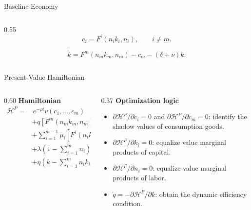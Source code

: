 \begin{frame}{Baseline Economy}
\begin{columns}[T,onlytextwidth]
\begin{column}{0.55\textwidth}
      \vspace{-0.02cm}
      \begin{equation*}
        c_i=F^i(n_i k_i,n_i),\qquad i\neq m .
      \end{equation*}

      \vspace{-0.02cm}
      \begin{equation*}
        \dot{k}=F^m(n_mk_m,n_m)-c_m-(\delta+\nu)k .
      \end{equation*}
    \end{column}
  \end{columns}
\end{frame}

\begin{frame}{Present-Value Hamiltonian}
  \scriptsize
  \setlength{\abovedisplayskip}{2pt}
  \setlength{\belowdisplayskip}{2pt}
  \setlength{\jot}{4pt}
  \begin{columns}[T,onlytextwidth]
    \begin{column}{0.60\textwidth}
      {\bfseries Hamiltonian}
      \vspace{-0.08cm}
      \begin{equation*}
        \begin{aligned}
          \mathcal H^P
          =&\, e^{-\rho t}v(c_1,\ldots,c_m)\\
          &+q\!\left[
            F^m(n_mk_m,n_m)-c_m-(\delta+\nu)k
          \right]\\
          &+\sum_{i=1}^{m-1}\mu_i\!\left[
            F^i(n_ik_i,n_i)-c_i
          \right]\\
          &+\lambda\!\left(1-\sum_{i=1}^m n_i\right)\\
          &+\eta\!\left(k-\sum_{i=1}^m n_i k_i\right).
        \end{aligned}
      \end{equation*}
    \end{column}
    \begin{column}{0.37\textwidth}
      \textbf{Optimization logic}
      \vspace{0.04cm}
      \begin{itemize}
        \setlength\itemsep{0.06cm}
        \item $\partial\mathcal H^P/\partial c_i=0$ and
          $\partial\mathcal H^P/\partial c_m=0$: identify the shadow
          values of consumption goods.
        \item $\partial\mathcal H^P/\partial k_i=0$: equalize value
          marginal products of capital.
        \item $\partial\mathcal H^P/\partial n_i=0$: equalize value
          marginal products of labor.
        \item $\dot q=-\partial\mathcal H^P/\partial k$: obtain the
          dynamic efficiency condition.
      \end{itemize}


\end{column}
\end{columns}
\end{frame}
